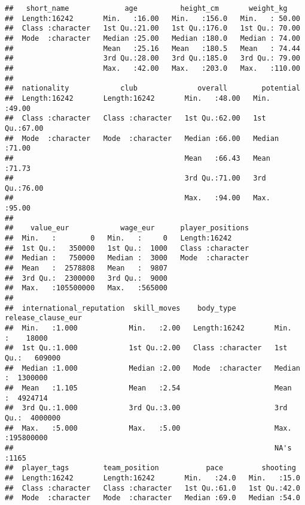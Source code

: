 \documentclass[
]{article}
\begin{document}
\begin{verbatim}
##   short_name             age          height_cm       weight_kg     
##  Length:16242       Min.   :16.00   Min.   :156.0   Min.   : 50.00  
##  Class :character   1st Qu.:21.00   1st Qu.:176.0   1st Qu.: 70.00  
##  Mode  :character   Median :25.00   Median :180.0   Median : 74.00  
##                     Mean   :25.16   Mean   :180.5   Mean   : 74.44  
##                     3rd Qu.:28.00   3rd Qu.:185.0   3rd Qu.: 79.00  
##                     Max.   :42.00   Max.   :203.0   Max.   :110.00  
##                                                                     
##  nationality            club              overall        potential    
##  Length:16242       Length:16242       Min.   :48.00   Min.   :49.00  
##  Class :character   Class :character   1st Qu.:62.00   1st Qu.:67.00  
##  Mode  :character   Mode  :character   Median :66.00   Median :71.00  
##                                        Mean   :66.43   Mean   :71.73  
##                                        3rd Qu.:71.00   3rd Qu.:76.00  
##                                        Max.   :94.00   Max.   :95.00  
##                                                                       
##    value_eur            wage_eur      player_positions  
##  Min.   :        0   Min.   :     0   Length:16242      
##  1st Qu.:   350000   1st Qu.:  1000   Class :character  
##  Median :   750000   Median :  3000   Mode  :character  
##  Mean   :  2578808   Mean   :  9807                     
##  3rd Qu.:  2300000   3rd Qu.:  9000                     
##  Max.   :105500000   Max.   :565000                     
##                                                         
##  international_reputation  skill_moves    body_type         release_clause_eur 
##  Min.   :1.000            Min.   :2.00   Length:16242       Min.   :    18000  
##  1st Qu.:1.000            1st Qu.:2.00   Class :character   1st Qu.:   609000  
##  Median :1.000            Median :2.00   Mode  :character   Median :  1300000  
##  Mean   :1.105            Mean   :2.54                      Mean   :  4924714  
##  3rd Qu.:1.000            3rd Qu.:3.00                      3rd Qu.:  4000000  
##  Max.   :5.000            Max.   :5.00                      Max.   :195800000  
##                                                             NA's   :1165       
##  player_tags        team_position           pace         shooting   
##  Length:16242       Length:16242       Min.   :24.0   Min.   :15.0  
##  Class :character   Class :character   1st Qu.:61.0   1st Qu.:42.0  
##  Mode  :character   Mode  :character   Median :69.0   Median :54.0  

\end{verbatim}
\end{document}
